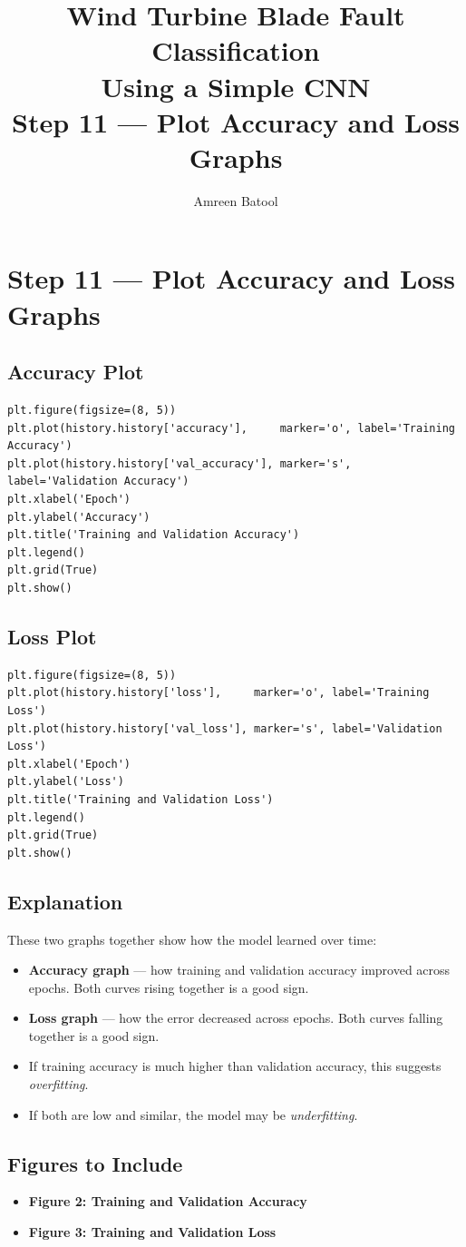 \documentclass[12pt]{article}
\title{\textbf{Wind Turbine Blade Fault Classification\\Using a Simple CNN}\\[0.5em]
\large Step 11 --- Plot Accuracy and Loss Graphs}
\author{Amreen Batool}
\date{}
\begin{document}
\maketitle

\section*{Step 11 --- Plot Accuracy and Loss Graphs}

\subsection*{Accuracy Plot}

\begin{lstlisting}[style=pythonstyle]
plt.figure(figsize=(8, 5))
plt.plot(history.history['accuracy'],     marker='o', label='Training Accuracy')
plt.plot(history.history['val_accuracy'], marker='s', label='Validation Accuracy')
plt.xlabel('Epoch')
plt.ylabel('Accuracy')
plt.title('Training and Validation Accuracy')
plt.legend()
plt.grid(True)
plt.show()
\end{lstlisting}

\subsection*{Loss Plot}

\begin{lstlisting}[style=pythonstyle]
plt.figure(figsize=(8, 5))
plt.plot(history.history['loss'],     marker='o', label='Training Loss')
plt.plot(history.history['val_loss'], marker='s', label='Validation Loss')
plt.xlabel('Epoch')
plt.ylabel('Loss')
plt.title('Training and Validation Loss')
plt.legend()
plt.grid(True)
plt.show()
\end{lstlisting}

\subsection*{Explanation}

These two graphs together show how the model learned over time:

\begin{itemize}
    \item \textbf{Accuracy graph} --- how training and validation accuracy improved across epochs. Both curves rising together is a good sign.
    \item \textbf{Loss graph} --- how the error decreased across epochs. Both curves falling together is a good sign.
    \item If training accuracy is much higher than validation accuracy, this suggests \textit{overfitting}.
    \item If both are low and similar, the model may be \textit{underfitting}.
\end{itemize}

\subsection*{Figures to Include}

\begin{itemize}
    \item \textbf{Figure 2: Training and Validation Accuracy}
    \item \textbf{Figure 3: Training and Validation Loss}
\end{itemize}
\end{document}
